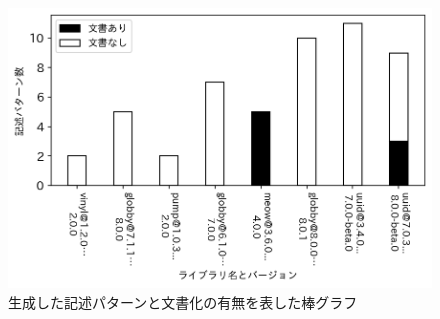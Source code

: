\documentclass[11pt]{jreport}
\begin{document}
\begin{figure}[t]
\centerline{\includegraphics[width=0.9\linewidth]{@BSthesis2024_Iida/BSthesis2024_Iida_fig/RQ1_bar_graph.pdf}}
\caption{生成した記述パターンと文書化の有無を表した棒グラフ}
\label{fig:bar_plot}
\end{figure}
\end{document}
